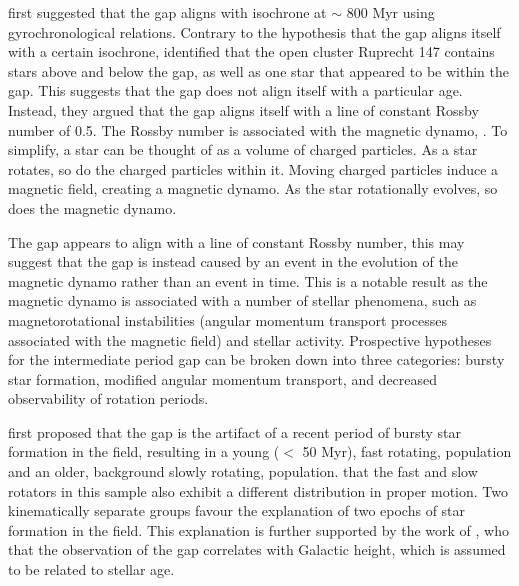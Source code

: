\citet{reinhold_transition_2019} first suggested that the gap aligns with isochrone at $\sim$ 800 Myr using \citet{barnes_simple_2010} gyrochronological relations.
Contrary to the hypothesis that the gap aligns itself with a certain isochrone, \citet{curtis_when_2020} identified that the open cluster Ruprecht 147 contains stars above and below the gap, as well as one star that appeared to be within the gap.
This suggests that the gap does not align itself with a particular age.
Instead, they argued that the gap aligns itself with a line of constant Rossby number of 0.5.
The Rossby number is associated with the magnetic dynamo, \citep[see, e.g.,][]{noyes_rotation_1984, montesinos_new_2001, augustson_rossby_2019}.
To simplify, a star can be thought of as a volume of charged particles.
As a star rotates, so do the charged particles within it.
Moving charged particles induce a magnetic field, creating a magnetic dynamo.
As the star rotationally evolves, so does the magnetic dynamo.

The gap appears to align with a line of constant Rossby number, this may suggest that the gap is instead caused by an event in the evolution of the magnetic dynamo rather than an event in time.
This is a notable result as the magnetic dynamo is associated with a number of stellar phenomena, such as magnetorotational instabilities (angular momentum transport processes associated with the magnetic field) and stellar activity.
Prospective hypotheses for the intermediate period gap can be broken down into three categories: bursty star formation, modified angular momentum transport, and decreased observability of rotation periods.

\citet{mcquillan_rotation_2014, davenport_rotating_2017} first proposed that the gap is the artifact of a recent period of bursty star formation in the \kepler{} field, resulting in a young ($<$ 50 Myr), fast rotating, population and an older, background slowly rotating, population.
\citet{davenport_rotating_2017}  that the fast and slow rotators in this sample also exhibit a different distribution in proper motion. 
Two kinematically separate groups  favour the explanation of two epochs of star formation in the \kepler{} field. 
This explanation is further supported by the work of \citet{davenport_rotating_2018}, who  that the observation of the gap correlates with Galactic height, which is assumed to be related to stellar age.


